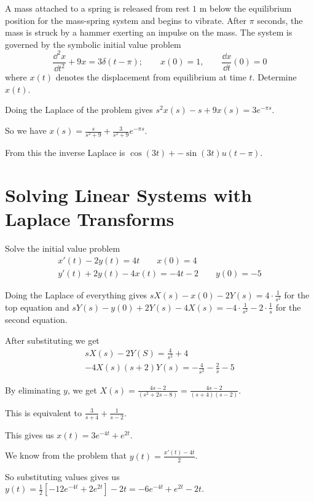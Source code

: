 \documentclass[../diffeq.tex]{subfiles}
\begin{document}
\begin{example}
    A mass attached to a spring is released from rest $1$ m below the equilibrium position for the mass-spring system and begins to vibrate. After $\pi$ seconds, the mass is struck by a hammer exerting an impulse on the mass.
    The system is governed by the symbolic initial value problem 
    \[ \frac{\dd^2 x}{\dd t^2} + 9x = 3\delta(t-\pi); \qquad x(0)=1, \qquad \frac{\dd x}{\dd t}(0)=0 \]
    where $x(t)$ denotes the displacement from equilibrium at time $t$. Determine $x(t)$.

    Doing the Laplace of the problem gives $s^2x(s)-s+9x(s)=3e^{-\pi s}$.

    So we have $x(s)=\frac{s}{s^2+9}+\frac{3}{s^2+9}e^{-\pi s}$.

    From this the inverse Laplace is $\cos (3t) + -\sin(3t)u(t-\pi)$.
\end{example}

\section{Solving Linear Systems with Laplace Transforms}
\begin{example}
    Solve the initial value problem 
    \begin{align*}
        x'(t)-2y(t)=4t \qquad x(0)=4 \\
        y'(t)+2y(t)-4x(t)=-4t-2 \qquad y(0)=-5
    \end{align*}

    Doing the Laplace of everything gives $sX(s)-x(0)-2Y(s)=4\cdot \frac{1}{s^2}$ for the top equation and $sY(s)-y(0)+2Y(s)-4X(s)=-4\cdot \frac{1}{s^2}-2\cdot \frac{1}{s}$ for the second equation.

    After substituting we get 
    \begin{align*}
        sX(s)-2Y(S)=\frac{4}{s^2}+4 \\
        -4X(s)(s+2)Y(s)=-\frac{4}{s^2}-\frac{2}{s}-5
    \end{align*}

    By eliminating $y$, we get $X(s)=\frac{4s-2}{(s^2+2s-8)}=\frac{4s-2}{(s+4)(s-2)}$.

    This is equivalent to $\frac{3}{s+4}+\frac{1}{s-2}$.

    This gives us $x(t)=3e^{-4t}+e^{2t}$.

    We know from the problem that $y(t)=\frac{x'(t)-4t}{2}$.

    So substituting values gives us $y(t)=\frac{1}{2}[-12e^{-4t}+2e^{2t}]-2t=-6e^{-4t}+e^{2t}-2t$.
\end{example}
\end{document}
